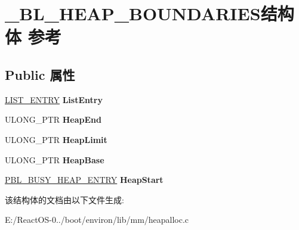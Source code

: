 \hypertarget{struct___b_l___h_e_a_p___b_o_u_n_d_a_r_i_e_s}{}\section{\+\_\+\+B\+L\+\_\+\+H\+E\+A\+P\+\_\+\+B\+O\+U\+N\+D\+A\+R\+I\+E\+S结构体 参考}
\label{struct___b_l___h_e_a_p___b_o_u_n_d_a_r_i_e_s}
\subsection*{Public 属性}
\begin{DoxyCompactItemize}
\item 
\mbox{\label{struct___b_l___h_e_a_p___b_o_u_n_d_a_r_i_e_s_aff1393e1f2639d7281defcd1c2de1f56}} 
\hyperlink{struct___l_i_s_t___e_n_t_r_y}{L\+I\+S\+T\+\_\+\+E\+N\+T\+RY} {\bfseries List\+Entry}
\item 
\mbox{\label{struct___b_l___h_e_a_p___b_o_u_n_d_a_r_i_e_s_aacc75fb968cdc12f9f480b5f82e4a9da}} 
U\+L\+O\+N\+G\+\_\+\+P\+TR {\bfseries Heap\+End}
\item 
\mbox{\label{struct___b_l___h_e_a_p___b_o_u_n_d_a_r_i_e_s_a4ebf7ba3b31d66497e0a9d14ce254323}} 
U\+L\+O\+N\+G\+\_\+\+P\+TR {\bfseries Heap\+Limit}
\item 
\mbox{\label{struct___b_l___h_e_a_p___b_o_u_n_d_a_r_i_e_s_af99d303259714b9f1270112287546f50}} 
U\+L\+O\+N\+G\+\_\+\+P\+TR {\bfseries Heap\+Base}
\item 
\mbox{\label{struct___b_l___h_e_a_p___b_o_u_n_d_a_r_i_e_s_a3dbdd421fe26a9c44c59c0092c06bf08}} 
\hyperlink{struct___b_l___b_u_s_y___h_e_a_p___e_n_t_r_y}{P\+B\+L\+\_\+\+B\+U\+S\+Y\+\_\+\+H\+E\+A\+P\+\_\+\+E\+N\+T\+RY} {\bfseries Heap\+Start}
\end{DoxyCompactItemize}


该结构体的文档由以下文件生成\+:\begin{DoxyCompactItemize}
\item 
E\+:/\+React\+O\+S-\/0../boot/environ/lib/mm/heapalloc.\+c\end{DoxyCompactItemize}
